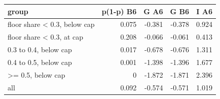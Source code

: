 \begin{tabular}{lrrrr}
\toprule
group & p(1-p) B6 & G A6 & G B6 & I A6 \\
\midrule
floor share < 0.3, below cap & 0.075 & -0.381 & -0.378 & 0.924 \\
floor share < 0.3, at cap & 0.208 & -0.066 & -0.061 & 0.413 \\
0.3 to 0.4, below cap & 0.017 & -0.678 & -0.676 & 1.311 \\
0.4 to 0.5, below cap & 0.001 & -1.398 & -1.396 & 1.677 \\
>= 0.5, below cap & 0 & -1.872 & -1.871 & 2.396 \\
all & 0.092 & -0.574 & -0.571 & 1.019 \\
\bottomrule
\end{tabular}
